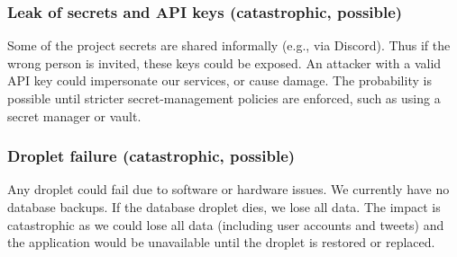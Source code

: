 \subsubsection{Leak of secrets and API keys (catastrophic, possible)}

Some of the project secrets are shared informally (e.g., via Discord). 
Thus if the wrong person is invited, these keys could be exposed. 
An attacker with a valid API key could impersonate our services, 
or cause damage. The probability is possible until stricter 
secret-management policies are enforced, 
such as using a secret manager or vault.

\subsubsection{Droplet failure (catastrophic, possible)}

Any droplet could fail due to software or hardware issues. We currently have 
no database backups. If the database droplet dies, we lose all data. 
The impact is catastrophic as we could lose all data (including user accounts 
and tweets) and the application would be unavailable until the droplet is 
restored or replaced.
